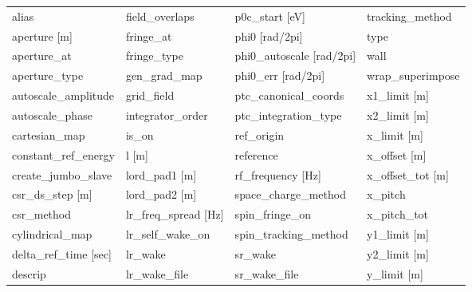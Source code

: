  \begin{tabular}{llll} \toprule
alias                            & field_overlaps                   & p0c_start [eV]                   & tracking_method                  \\
aperture [m]                     & fringe_at                        & phi0 [rad/2pi]                   & type                             \\
aperture_at                      & fringe_type                      & phi0_autoscale [rad/2pi]         & wall                             \\
aperture_type                    & gen_grad_map                     & phi0_err [rad/2pi]               & wrap_superimpose                 \\
autoscale_amplitude              & grid_field                       & ptc_canonical_coords             & x1_limit [m]                     \\
autoscale_phase                  & integrator_order                 & ptc_integration_type             & x2_limit [m]                     \\
cartesian_map                    & is_on                            & ref_origin                       & x_limit [m]                      \\
constant_ref_energy              & l [m]                            & reference                        & x_offset [m]                     \\
create_jumbo_slave               & lord_pad1 [m]                    & rf_frequency [Hz]                & x_offset_tot [m]                 \\
csr_ds_step [m]                  & lord_pad2 [m]                    & space_charge_method              & x_pitch                          \\
csr_method                       & lr_freq_spread [Hz]              & spin_fringe_on                   & x_pitch_tot                      \\
cylindrical_map                  & lr_self_wake_on                  & spin_tracking_method             & y1_limit [m]                     \\
delta_ref_time [sec]             & lr_wake                          & sr_wake                          & y2_limit [m]                     \\
descrip                          & lr_wake_file                     & sr_wake_file                     & y_limit [m]                      \\

\end{tabular}
